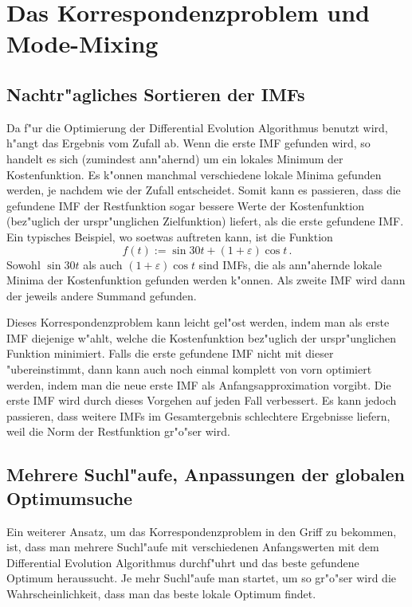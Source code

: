 \documentclass[a4paper]{scrartcl}
\begin{document}
\section{Das Korrespondenzproblem und Mode-Mixing}

\subsection{Nachtr"agliches Sortieren der IMFs}

Da f"ur die Optimierung der Differential Evolution Algorithmus benutzt wird, h"angt das Ergebnis vom Zufall ab. Wenn die erste IMF gefunden wird, so handelt es sich (zumindest ann"ahernd) um ein lokales Minimum der Kostenfunktion. Es k"onnen manchmal verschiedene lokale Minima gefunden werden, je nachdem wie der Zufall entscheidet. Somit kann es passieren, dass die gefundene IMF der Restfunktion sogar bessere Werte der Kostenfunktion (bez"uglich der urspr"unglichen Zielfunktion) liefert, als die erste gefundene IMF. Ein typisches Beispiel, wo soetwas auftreten kann, ist die Funktion
$$ f(t) := \sin 30t + (1+\varepsilon)\cos t\,. $$
Sowohl $\sin 30t$ als auch $(1+\varepsilon)\cos t$ sind IMFs, die als ann"ahernde lokale Minima der Kostenfunktion gefunden werden k"onnen. Als zweite IMF wird dann der jeweils andere Summand gefunden. 

Dieses Korrespondenzproblem kann leicht gel"ost werden, indem man als erste IMF diejenige w"ahlt, welche die Kostenfunktion bez"uglich der urspr"unglichen Funktion minimiert. Falls die erste gefundene IMF nicht mit dieser "ubereinstimmt, dann kann auch noch einmal komplett von vorn optimiert werden, indem man die neue erste IMF als Anfangsapproximation vorgibt. Die erste IMF wird durch dieses Vorgehen auf jeden Fall verbessert. Es kann jedoch passieren, dass weitere IMFs im Gesamtergebnis schlechtere Ergebnisse liefern, weil die Norm der Restfunktion gr"o"ser wird.


\subsection{Mehrere Suchl"aufe, Anpassungen der globalen Optimumsuche} \label{sec:aormchsogz}

Ein weiterer Ansatz, um das Korrespondenzproblem in den Griff zu bekommen, ist, dass man mehrere Suchl"aufe mit verschiedenen Anfangswerten mit dem Differential Evolution Algorithmus durchf"uhrt und das beste gefundene Optimum heraussucht. Je mehr Suchl"aufe man startet, um so gr"o"ser wird die Wahrscheinlichkeit, dass man das beste lokale Optimum findet. 
\end{document}
